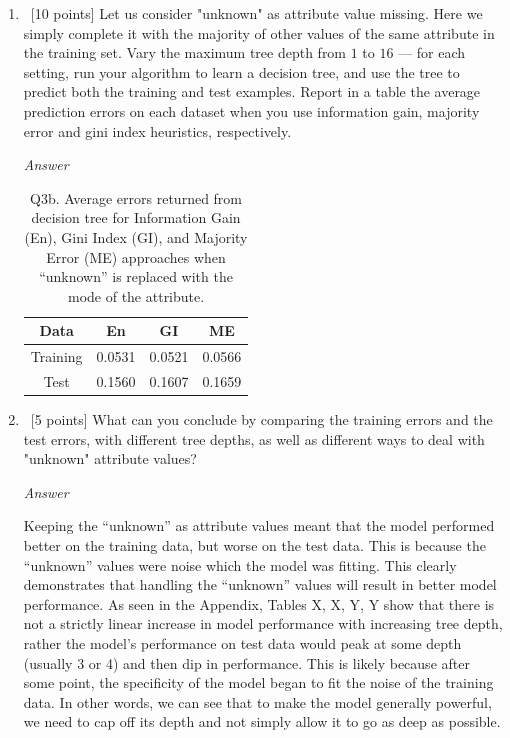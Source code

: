 \documentclass[12pt, fullpage,letterpaper]{article}
\begin{document}
\begin{enumerate}
\begin{enumerate}
	\item~[10 points] Let us consider "unknown" as  attribute value missing. Here we simply complete it with the majority of other values of the same attribute in the training set.   Vary the maximum  tree depth from $1$ to $16$ --- for each setting, run your algorithm to learn a decision tree, and use the tree to  predict both the training  and test examples. Report in a table the average prediction errors on each dataset when you use information gain, majority error and gini index heuristics, respectively.
	
	\emph{Answer}
	
	\begin{table}[h]
    	\centering
    	\begin{tabular}{c|ccc}
    		Data & En & GI & ME \\ 
    		\hline\hline
    		Training &  0.0531 & 0.0521 & 0.0566 \\ \hline
    		Test &  0.1560 & 0.1607 & 0.1659 \\ \hline
    	\end{tabular}
    	\caption{Q3b. Average errors returned from decision tree for Information Gain (En), Gini Index (GI), and Majority Error (ME) approaches when ``unknown'' is replaced with the mode of the attribute.}
    \end{table}
	
	\item~[5 points] What can you conclude by comparing the training errors and the test errors, with different tree depths, as well as different ways to deal with "unknown" attribute values?
	
	\emph{Answer}
	
	Keeping the ``unknown'' as attribute values meant that the model performed better on the training data, but worse on the test data. This is because the ``unknown'' values were noise which the model was fitting. This clearly demonstrates that handling the ``unknown'' values will result in better model performance. As seen in the Appendix, Tables X, X, Y, Y show that there is not a strictly linear increase in model performance with increasing tree depth, rather the model's performance on test data would peak at some depth (usually 3 or 4) and then dip in performance. This is likely because after some point, the specificity of the model began to fit the noise of the training data. In other words, we can see that to make the model generally powerful, we need to cap off its depth and not simply allow it to go as deep as possible.
	
\end{enumerate}
\end{enumerate}
\end{document}
